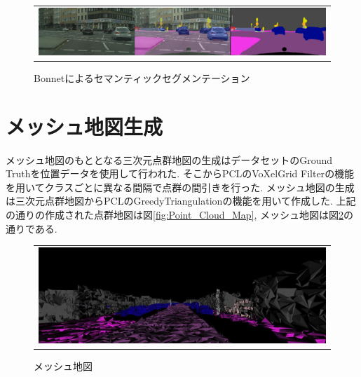 \begin{figure}[htbp]
\begin{center}
\begin{tabular}{c}
\begin{minipage}{1.0\hsize}
\begin{center}
\includegraphics[width=14cm]{./picture/semantic_segmentation_bonnet.png}
\caption{Bonnetによるセマンティックセグメンテーション}
\label{fig:Bonnet}
\end{center}
\end{minipage}
\end{tabular}
\end{center}
\end{figure}

\section{メッシュ地図生成}
メッシュ地図のもととなる三次元点群地図の生成はデータセットのGround Truthを位置データを使用して行われた. そこからPCLのVoXelGrid Filter\cite{PCL_VexelGrid_Link}\cite{VoxelGrid_paper_1}\cite{VoxelGrid_paper_2}の機能を用いてクラスごとに異なる間隔で点群の間引きを行った.  メッシュ地図の生成は三次元点群地図からPCLのGreedyTriangulation\cite{Marton09ICRA}の機能を用いて作成した. 上記の通りの作成された点群地図は図\ref{fig:Point_Cloud_Map}, メッシュ地図は図\ref{fig:Mesh_Map}の通りである.

\begin{figure}[htbp]
\begin{center}
\begin{tabular}{c}
\begin{minipage}{1.0\hsize}
\begin{center}
\includegraphics[width=14.5cm]{./picture/mesh_map.png}
\caption{メッシュ地図}
\label{fig:Mesh_Map}
\end{center}
\end{minipage}
\end{tabular}
\end{center}
\end{figure}

